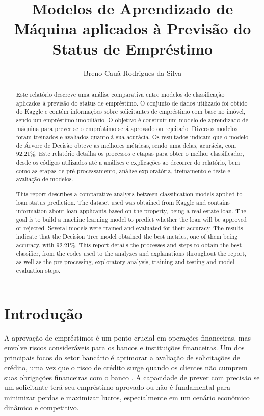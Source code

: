 \documentclass[a4paper,12pt]{article} %
\title{Modelos de Aprendizado de Máquina aplicados à Previsão do Status de Empréstimo}
\author{Breno Cauã Rodrigues da Silva}
\date{}
\begin{document}
\maketitle

\begin{abstract}
Este relatório descreve uma análise comparativa entre modelos de classificação aplicados à previsão do status de empréstimo. O conjunto de dados utilizado foi obtido do Kaggle e contém informações sobre solicitantes de empréstimo com base no imóvel, sendo um empréstimo imobiliário. O objetivo é construir um modelo de aprendizado de máquina para prever se o empréstimo será aprovado ou rejeitado. Diversos modelos foram treinados e avaliados quanto à sua acurácia. Os resultados indicam que o modelo de Árvore de Decisão obteve as melhores métricas, sendo uma delas, acurácia, com 92,21\%. Este relatório detalha os processos e etapas para obter o melhor classificador, desde os códigos utilizados até a análises e explicações ao decorrer do relatório, bem como as etapas de pré-processamento, análise exploratória, treinamento e teste e avaliação de modelos.
\end{abstract}

\begin{abstract}
This report describes a comparative analysis between classification models applied to loan status prediction. The dataset used was obtained from Kaggle and contains information about loan applicants based on the property, being a real estate loan. The goal is to build a machine learning model to predict whether the loan will be approved or rejected. Several models were trained and evaluated for their accuracy. The results indicate that the Decision Tree model obtained the best metrics, one of them being accuracy, with 92.21\%. This report details the processes and steps to obtain the best classifier, from the codes used to the analyzes and explanations throughout the report, as well as the pre-processing, exploratory analysis, training and testing and model evaluation steps.
\end{abstract}

\newpage


\section{Introdução}
A aprovação de empréstimos é um ponto crucial em operações financeiras, mas envolve riscos consideráveis para os bancos e instituições financeiras. Um dos principais focos do setor bancário é aprimorar a avaliação de solicitações de crédito, uma vez que o risco de crédito surge quando os clientes não cumprem suas obrigações financeiras com o banco \cite{maciel2015analise}. A capacidade de prever com precisão se um solicitante terá seu empréstimo aprovado ou não é fundamental para minimizar perdas e maximizar lucros, especialmente em um cenário econômico dinâmico e competitivo.
\end{document}
